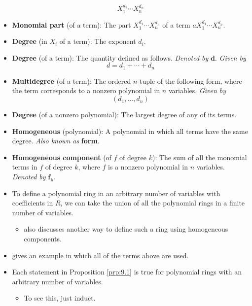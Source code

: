 \documentclass[../notes.tex]{subfiles}
\begin{document}
\begin{itemize}
    \begin{equation*}
        X_1^{d_1}\cdots X_n^{d_n}
    \end{equation*}
    \item \textbf{Monomial part} (of a term): The part $X_1^{d_1}\cdots X_n^{d_n}$ of a term $aX_1^{d_1}\cdots X_n^{d_n}$.
    \item \textbf{Degree} (in $X_i$ of a term): The exponent $d_i$.
    \item \textbf{Degree} (of a term): The quantity defined as follows. \emph{Denoted by} $\bm{d}$. \emph{Given by}
    \begin{equation*}
        d = d_1+\cdots+d_n
    \end{equation*}
    \item \textbf{Multidegree} (of a term): The ordered $n$-tuple of the following form, where the term corresponds to a nonzero polynomial in $n$ variables. \emph{Given by}
    \begin{equation*}
        (d_1,\dots,d_n)
    \end{equation*}
    \item \textbf{Degree} (of a nonzero polynomial): The largest degree of any of its terms.
    \item \textbf{Homogeneous} (polynomial): A polynomial in which all terms have the same degree. \emph{Also known as} \textbf{form}.
    \item \textbf{Homogeneous component} (of $f$ of degree $k$): The sum of all the monomial terms in $f$ of degree $k$, where $f$ is a nonzero polynomial in $n$ variables. \emph{Denoted by} $\bm{f_k}$.
    \item To define a polynomial ring in an arbitrary number of variables with coefficients in $R$, we can take the union of all the polynomial rings in a finite number of variables.
    \begin{itemize}
        \item \textcite{bib:DummitFoote} also discusses another way to define such a ring using homogeneous components.
    \end{itemize}
    \item \textcite{bib:DummitFoote} gives an example in which all of the terms above are used.
    \item Each statement in Proposition \ref{prp:9.1} is true for polynomial rings with an arbitrary number of variables.
    \begin{itemize}
        \item To see this, just induct.
    \end{itemize}
\end{itemize}
\end{document}
